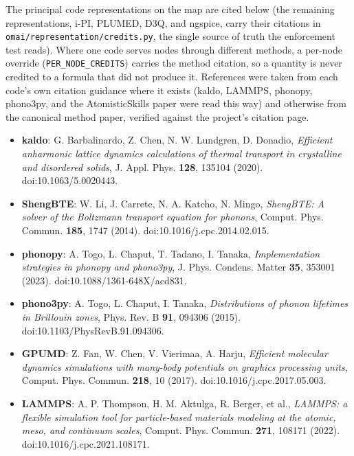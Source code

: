 \documentclass[11pt,a4paper]{article}
\begin{document}
The principal code representations on the map are cited below (the remaining
representations,
i-PI, PLUMED, D3Q, and ngspice, carry their citations in
\texttt{omai/representation/credits.py}, the single source of truth the
enforcement test reads). Where one code serves nodes through different
methods, a per-node override (\texttt{PER\_NODE\_CREDITS}) carries the
method citation, so a quantity is never credited to a formula that did not
produce it. References were taken from each code's
own citation guidance where it exists (kaldo, LAMMPS, phonopy, phono3py, and the
AtomisticSkills paper were read this way) and otherwise from the canonical method
paper, verified against the project's citation page.

\begin{itemize}[leftmargin=1.4em, itemsep=0.25em]
  \item \textbf{kaldo}: G. Barbalinardo, Z. Chen, N. W. Lundgren, D. Donadio,
        \emph{Efficient anharmonic lattice dynamics calculations of thermal
        transport in crystalline and disordered solids}, J. Appl. Phys.
        \textbf{128}, 135104 (2020). doi:10.1063/5.0020443.
  \item \textbf{ShengBTE}: W. Li, J. Carrete, N. A. Katcho, N. Mingo,
        \emph{ShengBTE: A solver of the Boltzmann transport equation for
        phonons}, Comput. Phys. Commun. \textbf{185}, 1747 (2014).
        doi:10.1016/j.cpc.2014.02.015.
  \item \textbf{phonopy}: A. Togo, L. Chaput, T. Tadano, I. Tanaka,
        \emph{Implementation strategies in phonopy and phono3py}, J. Phys.
        Condens. Matter \textbf{35}, 353001 (2023).
        doi:10.1088/1361-648X/acd831.
  \item \textbf{phono3py}: A. Togo, L. Chaput, I. Tanaka, \emph{Distributions of
        phonon lifetimes in Brillouin zones}, Phys. Rev. B \textbf{91}, 094306
        (2015). doi:10.1103/PhysRevB.91.094306.
  \item \textbf{GPUMD}: Z. Fan, W. Chen, V. Vierimaa, A. Harju, \emph{Efficient
        molecular dynamics simulations with many-body potentials on graphics
        processing units}, Comput. Phys. Commun. \textbf{218}, 10 (2017).
        doi:10.1016/j.cpc.2017.05.003.
  \item \textbf{LAMMPS}: A. P. Thompson, H. M. Aktulga, R. Berger, et al.,
        \emph{LAMMPS: a flexible simulation tool for particle-based materials
        modeling at the atomic, meso, and continuum scales}, Comput. Phys.
        Commun. \textbf{271}, 108171 (2022). doi:10.1016/j.cpc.2021.108171.

\end{itemize}
\end{document}
